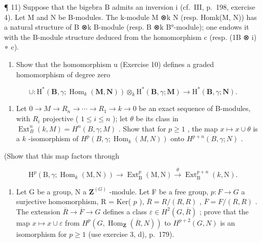 ¶ 11) Suppose that the bigebra B admits an inversion i (cf.~III, p.~198, exercise 4). Let M and N be B-modules. The k-module M ⊗k N (resp. Homk(M, N)) has a natural structure of B ⊗k B-module (resp. B ⊗k B°-module); one endows it with the B-module structure deduced from the homomorphism c (resp. (1B ⊗ i) ∘ c).

\begin{enumerate}
\def\labelenumi{\alph{enumi})}
\tightlist
\item
  Show that the homomorphism u (Exercise 10) defines a graded homomorphism of degree zero
\end{enumerate}

\[
\cup : \mathrm{H} ^ {*} (\mathbf {B}, \gamma ; \operatorname{Hom} _ {k} (\mathbf {M}, \mathbf {N})) \otimes_ {k} \mathrm{H} ^ {*} (\mathbf {B}, \gamma ; \mathbf {M}) \rightarrow \mathrm{H} ^ {*} (\mathbf {B}, \gamma ; \mathbf {N}).
\]

\begin{enumerate}
\def\labelenumi{\alph{enumi})}
\setcounter{enumi}{1}
\tightlist
\item
  Let \(0 \to M \to R_n \to \cdots \to R_1 \to k \to 0\) be an exact sequence of B-modules, with \(R_i\) projective ( \(1 \leqslant i \leqslant n\) ); let \(\theta\) be its class in \(\operatorname{Ext}_B^n(k, M) = H^n(B, \gamma; M)\) . Show that for \(p \geqslant 1\) , the map \(x \mapsto x \cup \theta\) is a \(k\) -isomorphism of \(H^p(B, \gamma; \operatorname{Hom}_k(M, N))\) onto \(H^{p+n}(B, \gamma; N)\) .
\end{enumerate}

(Show that this map factors through

\[
\mathrm{H} ^ {p} (\mathrm{B}, \gamma ; \operatorname{Hom} _ {k} (\mathrm{M}, \mathrm{N})) \rightarrow \operatorname{Ext} _ {\mathrm{B}} ^ {p} (\mathrm{M}, \mathrm{N}) \xrightarrow {\theta} \operatorname{Ext} _ {\mathrm{B}} ^ {p + n} (k, \mathrm{N}).
\]

\begin{enumerate}
\def\labelenumi{\alph{enumi})}
\setcounter{enumi}{2}
\tightlist
\item
  Let G be a group, N a \(\mathbf{Z}^{(G)}\) -module. Let F be a free group, \(p: F \to G\) a surjective homomorphism, R = Ker( \(p\) ), \(\overline{R} = R/(R, R)\) , \(\overline{F} = F/(R, R)\) . The extension \(\overline{R} \to \overline{F} \to G\) defines a class \(\varepsilon \in H^2(G, \overline{R})\) ; prove that the map \(x \mapsto x \cup \varepsilon\) from \(H^p(G, \operatorname{Hom}_{\mathbf{Z}}(\overline{R}, N))\) to \(H^{p+2}(G, N)\) is an isomorphism for \(p \geqslant 1\) (use exercise 3, d), p.~179).
\end{enumerate}

